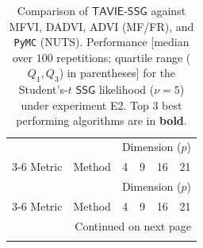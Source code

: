 \documentclass[12pt]{article}
\numberwithin{equation}{section}
\newcommand{\tssg}{\mathsf{TAVIE}\text{-}\mathsf{SSG}}
\begin{document}
{\scriptsize
\setlength{\tabcolsep}{3pt} %
\renewcommand{\arraystretch}{1.15}%
\begin{longtable}{llcccc}
\caption{\footnotesize{Comparison of $\tssg$ against MFVI, DADVI, ADVI (MF/FR), and \texttt{PyMC} (NUTS). Performance [median over $100$ repetitions; quartile range ($Q_1, Q_3$)  in parentheses] for the Student's-$t$ $\mathsf{SSG}$ likelihood ($\nu=5$) under experiment E2. { Top $3$ best performing algorithms are in \textbf{bold}.}}}
\label{tab:student_singlen_multip}\\\\
\toprule
\toprule
 &  & \multicolumn{4}{c}{Dimension ($p$)} \\
\cmidrule(lr){3-6}
Metric & Method & 4 & 9 & 16 & 21 \\
\midrule
\endfirsthead
\toprule
 &  & \multicolumn{4}{c}{Dimension ($p$)} \\
\cmidrule(lr){3-6}
Metric & Method & 4 & 9 & 16 & 21 \\
\midrule
\endhead
\midrule
\multicolumn{6}{r}{Continued on next page} \\
\midrule
\endfoot
\bottomrule
\endlastfoot


\end{longtable}}
\end{document}

